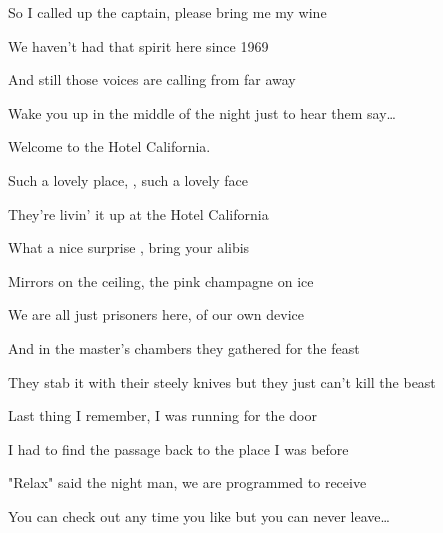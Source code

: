 \begin{song}
\bigskip

 So I called up the captain,  please bring me my wine  \par
{} We haven't had that spirit here since  1969 \par
{} And still those voices are calling from far away \par
{} Wake you up in the middle of the night  just to hear them say… \par

\bigskip

 Welcome to the Hotel California. \par
Such a lovely place, , such a lovely face \par
They're livin' it up at the Hotel California \par
What a nice surprise , bring your alibis \par

\bigskip

 Mirrors on the ceiling,  the pink champagne on ice  \par
{} We are all just prisoners here,  of our own device \par
{} And in the master's chambers  they gathered for the feast \par
{} They stab it with their steely knives but they just can't kill the beast \par

\bigskip

 Last thing I remember, I was  running for the door \par
{} I had to find the passage back to the place I was before \par
{} "Relax" said the night man, we are  programmed to receive \par
{} You can check out any time you like  but you can never leave… \par

\bigskip

\Outro \par
{}    \par
{}    \par
{}

\end{song}
